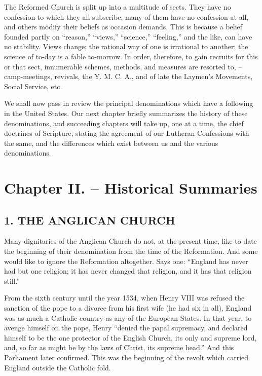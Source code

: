 \documentclass[
]{book}
\def\igobble#1{}
\begin{document}
The Reformed Church is split up into a multitude of sects. They have no confession to which they all subscribe; many of them have no confession at all, and others modify their beliefs as occasion demands. This is because a belief founded partly on ``reason,'' ``views,'' ``science,'' ``feeling,'' and the like, can have no stability. Views change; the rational way of one is irrational to another; the science of to-day is a fable to-morrow. In order, therefore, to gain recruits for this or that sect, innumerable schemes, methods, and measures are resorted to, -- camp-meetings, revivals, the Y. M. C. A., and of late the Laymen's Movements, Social Service, etc.

We shall now pass in review the principal denominations which have a following in the United States. Our next chapter briefly summarizes the history of these denominations, and succeeding chapters will take up, one at a time, the chief doctrines of Scripture, stating the agreement of our Lutheran Confessions with the same, and the differences which exist between us and the various denominations.

\section*{Chapter II. -- Historical Summaries}\label{chapter-ii.-historical-summaries}

\subsection*{1. THE ANGLICAN CHURCH}\label{the-anglican-church}

Many dignitaries of the Anglican\index{Anglican Church!zzzzz@\igobble|seealso{Episcopal Church}} Church do not, at the present time, like to date the beginning of their denomination from the time of the Reformation. And some would like to ignore the Reformation altogether. Says one: ``England has never had but one religion; it has never changed that religion, and it has that religion still.''

From the sixth century until the year 1534, when Henry VIII was refused the sanction of the pope to a divorce from his first wife (he had six in all), England was as much a Catholic country as any of the European States. In that year, to avenge himself on the pope, Henry ``denied the papal supremacy, and declared himself to be the one protector of the English Church, its only and supreme lord, and, so far as might be by the laws of Christ, its supreme head.'' And this Parliament later confirmed. This was the beginning of the revolt which carried England outside the Catholic fold.
\end{document}
